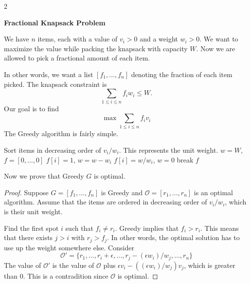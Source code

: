 \begin{multicols}{2}
\begin{leftbar}
    \textbf{Fractional Knapsack Problem}

    We have $n$ items, each with a value of $v_i > 0$ and a weight $w_i > 0$. We want to maximize the value while packing the knapsack with capacity $W$. Now we are allowed to pick a fractional amount of each item. 
\end{leftbar}

In other words, we want a list $[f_1, \ldots, f_n]$ denoting the fraction of each item picked. The knapsack constraint is 
$$
\sum_{1 \leq i \leq n}f_iw_i \leq W. 
$$
Our goal is to find
$$
\max \sum_{1 \leq i \leq n}f_iv_i
$$
The Greedy algorithm is fairly simple. 
\bigskip
\begin{algorithm}[H]
\caption{Fractional Knapsack Problem}
\begin{algorithmic}[1]
    \State Sort items in decreasing order of $v_i/w_i$. This represents the unit weight. 
    \State $w = W$, $f = [0, \ldots, 0]$
            \State $f[i] = 1$, $w = w - w_i$
        \Else 
            \State $f[i] = w/w_i$, $w = 0$
        \EndIf
        \State break
        \EndIf
    \EndFor
    \State \Return $f$
\end{algorithmic}
\end{algorithm}
Now we prove that Greedy $G$ is optimal. 
\begin{proof}
    Suppose $G = [f_1, \ldots, f_n]$ is Greedy and $\mathcal{O} = [r_1, \ldots, r_n]$ is an optimal algorithm. Assume that the items are ordered in decreasing order of $v_i/w_i$, which is their unit weight. 

    Find the first spot $i$ such that $f_i \neq r_i$. Greedy implies that $f_i > r_i$. This means that there exists $j > i$ with $r_j > f_j$. In other words, the optimal solution has to use up the weight somewhere else. Consider 
    $$
    \mathcal{O}' = \{r_1, \ldots, r_i + \epsilon, \ldots, r_j - (\epsilon w_i)/w_j, \ldots, r_n\}
    $$
    The value of $\mathcal{O}'$ is the value of $\mathcal{O}$ plus $\epsilon v_i - ((\epsilon w_i)/w_j)v_j$, which is greater than $0$. This is a contradition since $\mathcal{O}$ is optimal. 
\end{proof}
\end{multicols}
